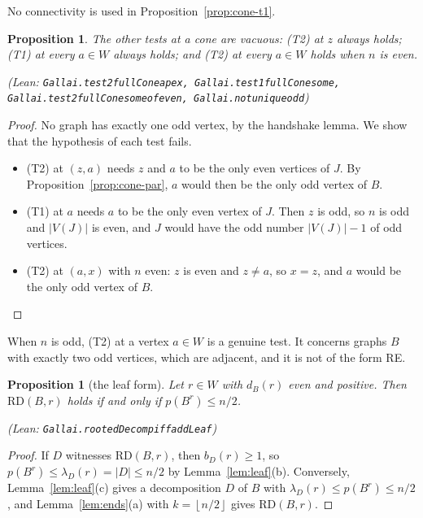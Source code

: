 \documentclass[11pt]{amsart}
\newtheorem{proposition}[theorem]{Proposition}
\theoremstyle{definition}
\theoremstyle{remark}
\renewcommand{\_}{\oldunderscore\allowbreak}
\newcommand{\leanst}[1]{\par{\raggedright\small\textup{(Lean: \texttt{#1})}\par}}
\newcommand{\fl}[1]{\left\lfloor #1\right\rfloor}
\begin{document}
No connectivity is used in Proposition~\ref{prop:cone-t1}.

\begin{proposition}\label{prop:cone-vac}
The other tests at a cone are vacuous: \textup{(T2)} at $z$ always holds; \textup{(T1)} at every
$a\in W$ always holds; and \textup{(T2)} at every $a\in W$ holds when $n$ is even.
\leanst{Gallai.test2\_fullCone\_apex, Gallai.test1\_fullCone\_some,
Gallai.test2\_fullCone\_some\_of\_even, Gallai.not\_unique\_odd}
\end{proposition}

\begin{proof}
No graph has exactly one odd vertex, by the handshake lemma. We show that the hypothesis of each test
fails.
\begin{itemize}[leftmargin=*]
\item (T2) at $(z,a)$ needs $z$ and $a$ to be the only even vertices of $J$. By
Proposition~\ref{prop:cone-par}, $a$ would then be the only odd vertex of $B$.
\item (T1) at $a$ needs $a$ to be the only even vertex of $J$. Then $z$ is odd, so $n$ is odd and
$|V(J)|$ is even, and $J$ would have the odd number $|V(J)|-1$ of odd vertices.
\item (T2) at $(a,x)$ with $n$ even: $z$ is even and $z\ne a$, so $x=z$, and $a$ would be the only
odd vertex of $B$.\qedhere
\end{itemize}
\end{proof}

When $n$ is odd, (T2) at a vertex $a\in W$ is a genuine test. It concerns graphs $B$ with exactly two
odd vertices, which are adjacent, and it is not of the form RE.

\begin{proposition}[the leaf form]\label{prop:cone-leaf}
Let $r\in W$ with $d_B(r)$ even and positive. Then $\mathrm{RD}(B,r)$ holds if and only if
$p(B^r)\le n/2$.
\leanst{Gallai.rootedDecomp\_iff\_addLeaf}
\end{proposition}

\begin{proof}
If $D$ witnesses $\mathrm{RD}(B,r)$, then $b_D(r)\ge1$, so $p(B^r)\le\lambda_D(r)=|D|\le n/2$ by
Lemma~\ref{lem:leaf}(b). Conversely, Lemma~\ref{lem:leaf}(c) gives a decomposition $D$ of $B$ with
$\lambda_D(r)\le p(B^r)\le n/2$, and Lemma~\ref{lem:ends}(a) with $k=\fl{n/2}$ gives $\mathrm{RD}(B,r)$.
\end{proof}
\end{document}
